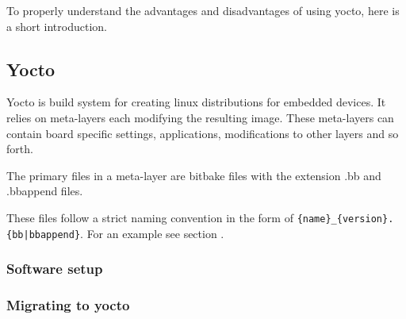 \documentclass[../../main.tex]{subfiles}
\begin{document}
To properly understand the advantages and disadvantages of using yocto, here is a short introduction.

\subsection{Yocto}%
\label{sub:yocto}

Yocto is build system for creating linux distributions for embedded devices. It relies on meta-layers
each modifying the resulting image. These meta-layers can contain board specific settings,
applications, modifications to other layers and so forth.

The primary files in a meta-layer are bitbake files with the extension .bb and .bbappend files.

These files follow a strict naming convention in the form of
\texttt{\{name\}\_\{version\}.\{bb|bbappend\}}. For an example see section .



%
%
%
%
%

\subsubsection{Software setup}%
\label{ssub:software_setup}



\subsubsection{Migrating to yocto}%
\label{ssub:migrating_to_yocto}

\end{document}
